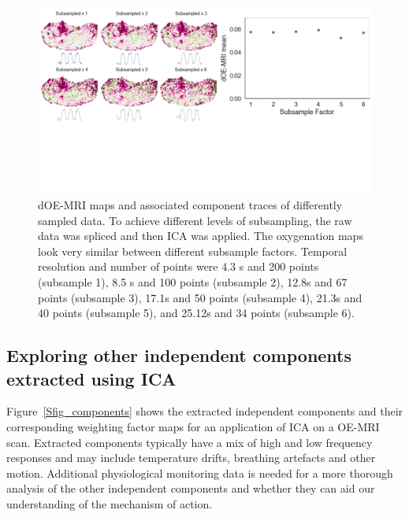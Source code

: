 \begin{figure}[htbp]
   \centering
   \includegraphics[width=\textwidth]{oemri_thesis1/oemri_thesis1-images/technical_subsample.pdf} %
   \caption{dOE-MRI maps and associated component traces of differently sampled data. To achieve different levels of subsampling, the raw data was spliced and then \ac{ICA} was applied. The oxygenation maps look very similar between different subsample factors. Temporal resolution and number of points were 4.3 s and 200 points (subsample 1), 8.5 s and 100 points (subsample 2), 12.8s and 67 points (subsample 3), 17.1s and 50 points (subsample 4), 21.3s and 40 points (subsample 5), and 25.12s and 34 points (subsample 6).}
   \label{subSample}
\end{figure}

\subsection{Exploring other independent components extracted using \ac{ICA}}

Figure~\ref{Sfig_components} shows the extracted independent components and their corresponding weighting factor maps for an application of \ac{ICA} on a OE-MRI scan.
Extracted components typically have a mix of high and low frequency responses and may include temperature drifts, breathing artefacts and other motion. 
Additional physiological monitoring data is needed for a more thorough analysis of the other independent components and whether they can aid our understanding of the mechanism of action.

